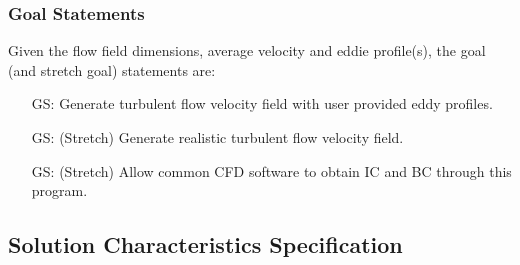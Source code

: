 \documentclass[12pt]{article}
\newcounter{goalnum} %
\begin{document}


\subsubsection{Goal Statements}


\noindent Given the flow field dimensions, average velocity and eddie profile(s), the goal (and stretch goal) statements are:

\begin{itemize}

\item[GS\refstepcounter{goalnum}\thegoalnum \label{G_anyFlowField}:] Generate turbulent flow velocity field with user provided eddy profiles.
\item[GS\refstepcounter{goalnum}\thegoalnum \label{G_realFlowField}:] (Stretch) Generate realistic turbulent flow velocity field.
\item[GS\refstepcounter{goalnum}\thegoalnum \label{G_interfaceCFD}:] (Stretch) Allow common CFD software to obtain IC and BC through this program.


\end{itemize}

\subsection{Solution Characteristics Specification}
\end{document}

